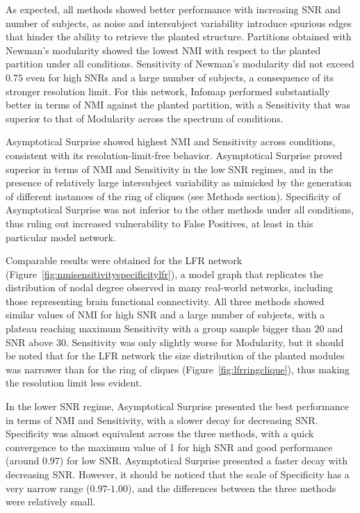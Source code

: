 As expected, all methods showed better performance with increasing SNR and number of subjects, as noise and intersubject variability introduce spurious edges that hinder the ability to retrieve the planted structure.
Partitions obtained with Newman's modularity showed the lowest NMI with respect to the planted partition under all conditions.
Sensitivity of Newman's modularity did not exceed $0.75$ even for high SNRs and a large number of subjects, a consequence of its stronger resolution limit.
For this network, Infomap performed substantially better in terms of NMI against the planted partition, with a Sensitivity that was superior to that of Modularity across the spectrum of conditions.

Asymptotical Surprise showed highest NMI and Sensitivity across conditions, consistent with its resolution-limit-free behavior. Asymptotical Surprise proved superior in terms of NMI and Sensitivity in the low SNR regimes, and in the presence of relatively large intersubject variability as mimicked by the generation of different instances of the ring of cliques (see Methods section). Specificity of Asymptotical Surprise was not inferior to the other methods under all conditions, thus ruling out increased vulnerability to False Positives, at least in this particular model network.

Comparable results were obtained for the LFR network
(Figure~\ref{fig:nmisensitivityspecificitylfr}), a model graph that replicates the distribution of nodal degree observed in many real-world networks, including those representing brain functional connectivity.
All three methods showed similar values of NMI for high SNR and a large number of subjects, with a plateau reaching maximum Sensitivity with a group sample bigger than $20$ and SNR above $30$.
Sensitivity was only slightly worse for Modularity, but it should be noted that for the LFR network the size distribution of the planted modules was narrower than for the ring of cliques (Figure~\ref{fig:lfrringclique}), thus making the resolution limit less evident.

In the lower SNR regime, Asymptotical Surprise presented the best performance in terms of NMI and Sensitivity, with a slower decay for decreasing SNR. 
Specificity was almost equivalent across the three methods, with a quick convergence to the maximum value of 1 for high SNR and good performance (around $0.97$) for low SNR.
Asymptotical Surprise presented a faster decay with decreasing SNR.
However, it should be noticed that the scale of Specificity has a very narrow range ($0.97$-$1.00$), and the differences between the three methods were relatively small.

